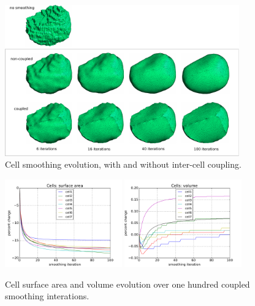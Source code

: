 \documentclass[a4paper,10pt]{article}
\begin{document}
\begin{figure}[H]
\begin{center}
\includegraphics[width=0.9\textwidth]{images/evolution.pdf}
\end{center}
\caption{Cell smoothing evolution, with and without inter-cell coupling.}
\label{fig:cell_morph}
\end{figure}

\begin{figure}[H]
\begin{center}
\includegraphics[width=0.45\textwidth]{images/cell_surf_100.pdf}
\includegraphics[width=0.45\textwidth]{images/cell_vol_100.pdf}
\end{center}
\caption{Cell surface area and volume evolution over one hundred coupled smoothing interations.}
\label{fig:100_iterations}
\end{figure}
\end{document}
